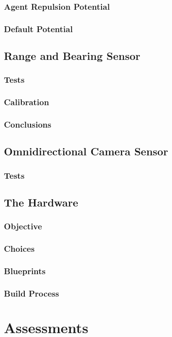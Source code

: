 \documentclass[a4paper, 12pt]{report}
\begin{document}
		\subsection{Agent Repulsion Potential}
		\subsection{Default Potential}
	\section{Range and Bearing Sensor}
		\subsection{Tests}
		\subsection{Calibration}
		\subsection{Conclusions}

	\section{Omnidirectional Camera Sensor}
		\subsection{Tests}

	\section{The Hardware}
		\subsection{Objective}
		\subsection{Choices}
		\subsection{Blueprints}
		\subsection{Build Process}

\chapter{Assessments}
\end{document}
